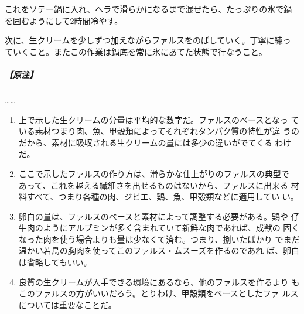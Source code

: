 \begin{recette}
これをソテー鍋に入れ、ヘラで滑らかになるまで混ぜたら、たっぷりの氷で鍋
を囲むようにして2時間冷やす。

次に、生クリームを少しずつ加えながらファルスをのばしていく。丁寧に練っ
ていくこと。またこの作業は鍋底を常に氷にあてた状態で行なうこと。

\hypertarget{ux539fux6ce8-2}{%
\subparagraph{【原注】}\label{ux539fux6ce8-2}}

\ldots{}\ldots{}

\begin{enumerate}
\def\labelenumi{\arabic{enumi}.}
\item
  上で示した生クリームの分量は平均的な数字だ。ファルスのベースとなっ
  ている素材つまり肉、魚、甲殻類によってそれぞれタンパク質の特性が違
  うのだから、素材に吸収される生クリームの量には多少の違いがでてくる
  わけだ。
\item
  ここで示したファルスの作り方は、滑らかな仕上がりのファルスの典型で
  あって、これを越える繊細さを出せるものはないから、ファルスに出来る
  材料すべて、つまり各種の肉、ジビエ、鶏、魚、甲殻類などに適用してい
  い。
\item
  卵白の量は、ファルスのベースと素材によって調整する必要がある。鶏や
  仔牛肉のようにアルブミンが多く含まれていて新鮮な肉であれば、成獣の
  固くなった肉を使う場合よりも量は少なくて済む。つまり、捌いたばかり
  でまだ温かい若鳥の胸肉を使ってこのファルス・ムスーズを作るのであれ
  ば、卵白は省略してもいい。
\item
  良質の生クリームが入手できる環境にあるなら、他のファルスを作るより
  もこのファルスの方がいいだろう。とりわけ、甲殻類をベースとしたファ
  ルスについては重要なことだ。
\end{enumerate}
\end{recette}
